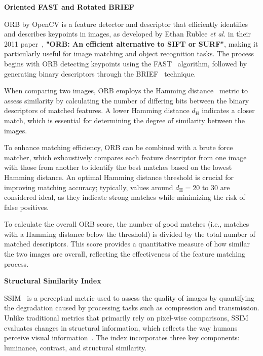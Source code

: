 \documentclass[12pt,DIV14,BCOR12mm,a4paper,footinclude=false,headinclude,parskip=half-,twoside,openright,cleardoublepage=empty,toc=index,bibliography=totoc,listof=totoc]{scrreprt}
\numberwithin{equation}{chapter}
\begin{document}
\textbf{Oriented FAST and Rotated BRIEF}

ORB by OpenCV is a feature detector and descriptor that efficiently identifies and describes keypoints in images, as developed by Ethan Rublee \textit{et al.} in their 2011 paper~\cite{ORB}, \textbf{"ORB: An efficient alternative to SIFT or SURF"}, making it particularly useful for image matching and object recognition tasks. The process begins with ORB detecting keypoints using the FAST~\cite{rosten2006machine} algorithm, followed by generating binary descriptors through the BRIEF~\cite{calonder2010brief} technique.

When comparing two images, ORB employs the Hamming distance~\cite{bookstein2002generalized, norouzi2012hamming} metric to assess similarity by calculating the number of differing bits between the binary descriptors of matched features. A lower Hamming distance \(d_{\mathrm{H}}\) indicates a closer match, which is essential for determining the degree of similarity between the images.

To enhance matching efficiency, ORB can be combined with a brute force matcher, which exhaustively compares each feature descriptor from one image with those from another to identify the best matches based on the lowest Hamming distance. An optimal Hamming distance threshold is crucial for improving matching accuracy; typically, values around \(d_{\mathrm{H}} = 20\) to \(30\) are considered ideal, as they indicate strong matches while minimizing the risk of false positives.

To calculate the overall ORB score, the number of good matches (i.e., matches with a Hamming distance below the threshold) is divided by the total number of matched descriptors. This score provides a quantitative measure of how similar the two images are overall, reflecting the effectiveness of the feature matching process.

\textbf{Structural Similarity Index}

SSIM~\cite{bakurov2022structural, brunet2011mathematical} is a perceptual metric used to assess the quality of images by quantifying the degradation caused by processing tasks such as compression and transmission. Unlike traditional metrics that primarily rely on pixel-wise comparisons, SSIM evaluates changes in structural information, which reflects the way humans perceive visual information~\cite{sara2019image}. The index incorporates three key components: luminance, contrast, and structural similarity.
\end{document}
